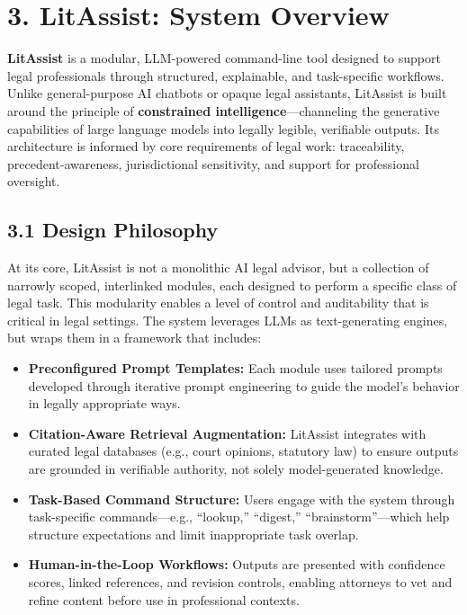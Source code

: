 \documentclass[12pt,a4paper]{article}
\begin{document}
\section*{3. LitAssist: System Overview}

\textbf{LitAssist} is a modular, LLM-powered command-line tool designed to support legal professionals through structured, explainable, and task-specific workflows. Unlike general-purpose AI chatbots or opaque legal assistants, LitAssist is built around the principle of \textbf{constrained intelligence}—channeling the generative capabilities of large language models into legally legible, verifiable outputs. Its architecture is informed by core requirements of legal work: traceability, precedent-awareness, jurisdictional sensitivity, and support for professional oversight.

\subsection*{3.1 Design Philosophy}

At its core, LitAssist is not a monolithic AI legal advisor, but a collection of narrowly scoped, interlinked modules, each designed to perform a specific class of legal task. This modularity enables a level of control and auditability that is critical in legal settings. The system leverages LLMs as text-generating engines, but wraps them in a framework that includes:

\begin{itemize}
\item \textbf{Preconfigured Prompt Templates:} Each module uses tailored prompts developed through iterative prompt engineering to guide the model's behavior in legally appropriate ways.

\item \textbf{Citation-Aware Retrieval Augmentation:} LitAssist integrates with curated legal databases (e.g., court opinions, statutory law) to ensure outputs are grounded in verifiable authority, not solely model-generated knowledge.

\item \textbf{Task-Based Command Structure:} Users engage with the system through task-specific commands—e.g., ``lookup,'' ``digest,'' ``brainstorm''—which help structure expectations and limit inappropriate task overlap.

\item \textbf{Human-in-the-Loop Workflows:} Outputs are presented with confidence scores, linked references, and revision controls, enabling attorneys to vet and refine content before use in professional contexts.
\end{itemize}
\end{document}
